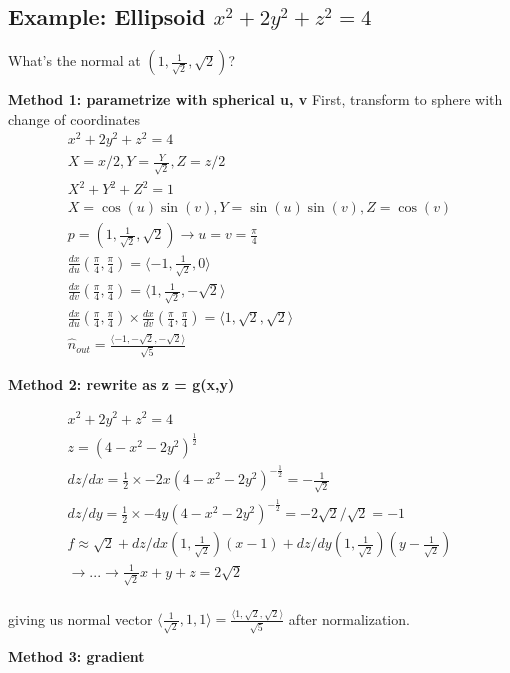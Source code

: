 \documentclass[11pt, oneside]{article}   	%
\begin{document}
\subsection{Example: Ellipsoid $x^2 + 2y^2 + z^2 = 4$}
What's the normal at $(1, \frac{1}{\sqrt{2}}, \sqrt{2})$?

\textbf{Method 1: parametrize with spherical u, v}
First, transform to sphere with change of coordinates
\begin{align}
x^2 + 2y^2 + z^2 = 4 \\
X = x/2, Y=\frac{Y}{\sqrt{2}}, Z = z/2 \\
X^2 + Y^2 + Z^2 = 1 \\
X = \cos(u)\sin(v), Y = \sin(u)\sin(v), Z = \cos(v) \\
p = (1, \frac{1}{\sqrt{2}}, \sqrt{2})  \rightarrow u = v = \frac{\pi}{4} \\
\frac{dx}{du}(\frac{\pi}{4}, \frac{\pi}{4}) = \langle -1, \frac{1}{\sqrt{2}}, 0 \rangle \\
\frac{dx}{dv}(\frac{\pi}{4}, \frac{\pi}{4}) = \langle 1, \frac{1}{\sqrt{2}}, -\sqrt{2} \rangle \\
\frac{dx}{du}(\frac{\pi}{4}, \frac{\pi}{4}) \times \frac{dx}{dv}(\frac{\pi}{4}, \frac{\pi}{4}) = \langle 1, \sqrt{2}, \sqrt{2}\rangle \\
\hat{n}_{out} = \frac{\langle -1, -\sqrt{2}, -\sqrt{2}\rangle }{\sqrt{5}}
\end{align}


\textbf{Method 2: rewrite as z = g(x,y)}

\begin{align}
x^2 + 2y^2 + z^2 = 4 \\
z = (4 - x^2 - 2y^2)^\frac{1}{2} \\
dz / dx = \frac{1}{2} \times -2x (4 - x^2 - 2y^2)^{-\frac{1}{2}} = -\frac{1}{\sqrt{2}} \\
dz / dy = \frac{1}{2} \times -4y (4 - x^2 - 2y^2)^{-\frac{1}{2}} =-2\sqrt{2}/\sqrt{2} = -1\\
f \approx \sqrt{2}  + dz / dx(1, \frac{1}{\sqrt{2}})(x - 1) + dz / dy (1,  \frac{1}{\sqrt{2}}) (y - \frac{1}{\sqrt{2}})\\
\rightarrow ... \rightarrow \frac{1}{\sqrt{2}}x + y + z = 2\sqrt{2} \\
\end{align}

giving us normal vector $\langle \frac{1}{\sqrt{2}}, 1, 1 \rangle = \frac{\langle 1, \sqrt{2}, \sqrt{2}\rangle }{\sqrt{5}}$
after normalization.

\textbf{Method 3: gradient}
\end{document}
